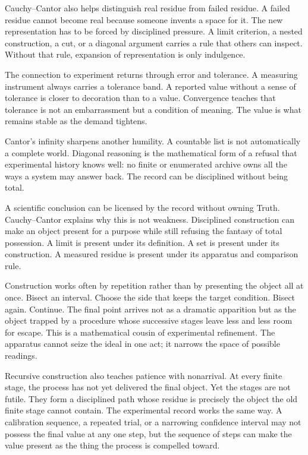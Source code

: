 Cauchy--Cantor also helps distinguish real residue from failed residue.
A failed residue cannot become real because someone invents a space for
it. The new representation has to be forced by disciplined pressure. A
limit criterion, a nested construction, a cut, or a diagonal argument
carries a rule that others can inspect. Without that rule, expansion of
representation is only indulgence.

The connection to experiment returns through error and tolerance. A
measuring instrument always carries a tolerance band. A reported value
without a sense of tolerance is closer to decoration than to a value.
Convergence teaches that tolerance is not an embarrassment but a
condition of meaning. The value is what remains stable as the demand
tightens.

Cantor's infinity sharpens another humility. A countable list is not
automatically a complete world. Diagonal reasoning is the mathematical
form of a refusal that experimental history knows well: no finite or
enumerated archive owns all the ways a system may answer back. The record can be disciplined
without being total.

A scientific conclusion can be licensed by the record without owning
Truth. Cauchy--Cantor explains why this is not weakness. Disciplined
construction can make an object present for a purpose while still
refusing the fantasy of total possession. A limit is present under its
definition. A set is present under its construction. A measured residue
is present under its apparatus and comparison rule.

Construction works often by repetition rather than by presenting the
object all at once. Bisect an interval. Choose the side that keeps the
target condition. Bisect again. Continue. The final point arrives not
as a dramatic apparition but as the object trapped by a procedure whose
successive stages leave less and less room for escape. This is a
mathematical cousin of experimental refinement. The apparatus cannot
seize the ideal in one act; it narrows the space of possible readings.

Recursive construction also teaches patience with nonarrival. At every
finite stage, the process has not yet delivered the final object. Yet
the stages are not futile. They form a disciplined path whose residue
is precisely the object the old finite stage cannot contain. The
experimental record works the same way. A calibration sequence, a
repeated trial, or a narrowing confidence interval may not possess the
final value at any one step, but the sequence of steps can make the
value present as the thing the process is compelled toward.

